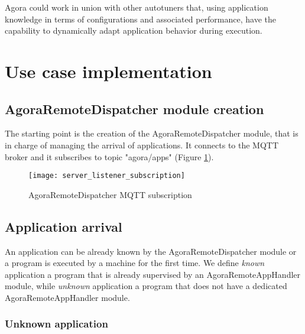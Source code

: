 Agora could work in union with other autotuners that, using application knowledge in terms of configurations and associated performance, have the capability to dynamically adapt application behavior during execution.










\section{Use case implementation}





\subsection{AgoraRemoteDispatcher module creation}

The starting point is the creation of the AgoraRemoteDispatcher module, that is in charge of managing the arrival of applications. It connects to the MQTT broker and it subscribes to topic "agora/apps" (Figure \ref{fig::dispSub}).

\begin{figure}[ht]

    \centering
    \texttt{[image: server\_listener\_subscription]}
    \caption{AgoraRemoteDispatcher MQTT subscription}

    \label{fig::dispSub}
    
\end{figure}





\subsection{Application arrival}

An application can be already known by the Agora\-Remote\-Dis\-patch\-er module or a program is executed by a machine for the first time. We define \textit{known} application a program that is already supervised by an AgoraRemoteAppHandler module, while \textit{unknown} application a program that does not have a dedicated AgoraRemoteAppHandler module.

\subsubsection{Unknown application}


